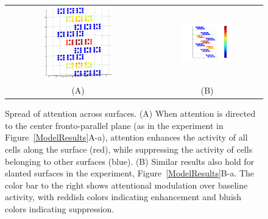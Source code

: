 
\begin{figure}[t]
\centering
\begin{tabular}{c c}
\includegraphics[width=0.5\textwidth]{3D-Surface/figs/2a_nocbar} &
\includegraphics[width=0.5\textwidth]{3D-Surface/figs/attentionmod}\\
(A) & (B)
\end{tabular}
\makeatletter
\let\@currsize\normalsize
\caption[Spread of attention across surfaces]{Spread of attention across surfaces. (A) When attention is directed to the center fronto-parallel plane (as in the experiment in Figure~\ref*{ModelResults}A-a), attention enhances the activity of all cells along the surface (red), while suppressing the activity of cells belonging to other surfaces (blue). (B) Similar results also hold for slanted surfaces in the experiment, Figure~\ref{ModelResults}B-a. The color bar to the right shows attentional modulation over baseline activity, with reddish colors indicating enhancement and bluish colors indicating suppression.}
\label{ModelResults2}
\end{figure}

